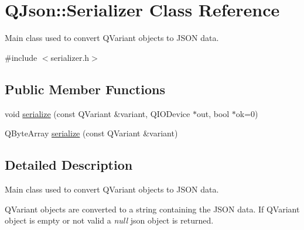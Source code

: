 \hypertarget{class_q_json_1_1_serializer}{
\section{\-Q\-Json\-:\-:\-Serializer \-Class \-Reference}
\label{class_q_json_1_1_serializer}
}


\-Main class used to convert \-Q\-Variant objects to \-J\-S\-O\-N data.  




{\ttfamily \#include $<$serializer.\-h$>$}

\subsection*{\-Public \-Member \-Functions}
\begin{DoxyCompactItemize}
\item 
void \hyperlink{class_q_json_1_1_serializer_a0c381665f412ea6bf69284113e67e192}{serialize} (const \-Q\-Variant \&variant, \-Q\-I\-O\-Device $\ast$out, bool $\ast$ok=0)
\item 
\-Q\-Byte\-Array \hyperlink{class_q_json_1_1_serializer_a3b3407e527f6301c0080c7c2109c987a}{serialize} (const \-Q\-Variant \&variant)
\end{DoxyCompactItemize}


\subsection{\-Detailed \-Description}
\-Main class used to convert \-Q\-Variant objects to \-J\-S\-O\-N data. 

\-Q\-Variant objects are converted to a string containing the \-J\-S\-O\-N data. \-If \-Q\-Variant object is empty or not valid a {\itshape null\/} json object is returned. 

